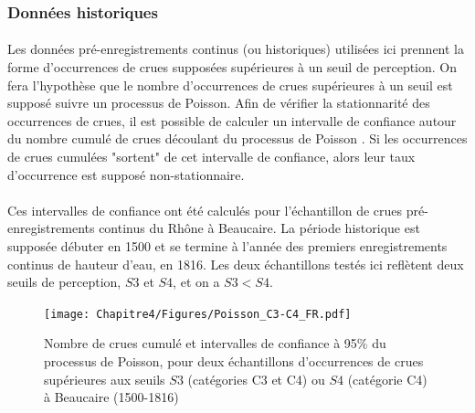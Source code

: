 
		
	\subsubsection{Données historiques}
	
	\paragraph{} Les données pré-enregistrements continus (ou historiques) utilisées ici prennent la forme d'occurrences de crues supposées supérieures à un seuil de perception. On fera l'hypothèse que le nombre  d'occurrences de crues supérieures à un seuil est supposé suivre un processus de Poisson. Afin de vérifier la stationnarité des occurrences de crues, il est possible de calculer un intervalle de confiance autour du nombre cumulé de crues découlant du processus de Poisson \citep{lang_towards_1999}. Si les occurrences de crues cumulées "sortent" de cet intervalle de confiance, alors leur taux d'occurrence est supposé non-stationnaire. 
	
	\paragraph{} Ces intervalles de confiance ont été calculés pour l'échantillon de crues pré-enregistrements continus du Rhône à Beaucaire. La période historique est supposée débuter en 1500 et se termine à l'année des premiers enregistrements continus de hauteur d'eau, en 1816. Les deux échantillons testés ici reflètent deux seuils de perception, $S3$ et $S4$, et on a $S3 < S4$. 

	\begin{figure}[h!]
		\centering
		\texttt{[image: Chapitre4/Figures/Poisson\_C3-C4\_FR.pdf]}	
		\caption{Nombre de crues cumulé et intervalles de confiance à 95\% du processus de 						Poisson, pour deux échantillons d'occurrences de crues supérieures aux seuils $S3$ (catégories C3 et C4) ou $S4$ (catégorie C4) à Beaucaire (1500-1816)}
		\label{fig:Poisson_C3-C4}
	\end{figure}		
	
